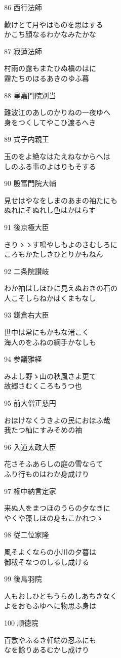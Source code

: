 \begin{shiika}
\end{shiika}86 西行法師     \begin{shiika}歎けとて月やはものを思はする\\かこち顔なるわかなみたかな 
\end{shiika}87 寂蓮法師     \begin{shiika}村雨の露もまたひぬ槇のはに\\霧たちのほるあきのゆふ暮 
\end{shiika}88 皇嘉門院別当 \begin{shiika}難波江のあしのかりねの一夜ゆへ\\身をつくしてやこひ渡るへき 
\end{shiika}89 式子内親王   \begin{shiika}玉のをよ絶なはたえねなからへは\\しのふる事のよはりもそする 
\end{shiika}90 殷富門院大輔 \begin{shiika}見せはやなをしまのあまの袖たにも\\ぬれにそぬれし色はかはらす 
\end{shiika}91 後京極大臣   \begin{shiika}きりゝゝす鳴やしもよのさむしろに\\ころもかたしきひとりかもねん
\end{shiika}92 二条院讃岐   \begin{shiika}わか袖はしほひに見えぬおきの石の\\人こそしらねかはくまもなし 
\end{shiika}93 鎌倉右大臣   \begin{shiika}世中は常にもかもな渚こく\\海人のをふねの綱手かなしも 
\end{shiika}94 参議雅経     \begin{shiika}みよし野ゝ山の秋風さよ更て\\故郷さむくころもうつ也 
\end{shiika}95 前大僧正慈円 \begin{shiika}おほけなくうきよの民におほふ哉\\我たつ杣にすみそめの袖 
\end{shiika}96 入道太政大臣 \begin{shiika}花さそふあらしの庭の雪ならて\\ふり行ものはわか身成けり 
\end{shiika}97 権中納言定家 \begin{shiika}来ぬ人をまつほのうらの夕なきに\\やくや藻しほの身もこかれつゝ 
\end{shiika}98 従二位家隆   \begin{shiika}風そよくならの小川の夕暮は\\御秡そなつのしるし成ける 
\end{shiika}99 後鳥羽院     \begin{shiika}人もおしひともうらめしあちきなく\\よをおもふゆへに物思ふ身は 
\end{shiika}100 順徳院      \begin{shiika}百敷やふるき軒端の忍ふにも\\なを餘りあるむかし成けり 
\end{shiika}

